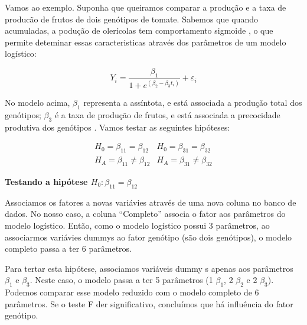 \documentclass[
]{book}
\begin{document}
Vamos ao exemplo. Suponha que queiramos comparar a produção e a taxa de producão de frutos de dois genótipos de tomate. Sabemos que quando acumuladas, a podução de olerícolas tem comportamento sigmoide \citep{Lucio2015, Lucio2016}, o que permite deteminar essas caracteristicas através dos parâmetros de um modelo logístico:

\[
{Y_i} = \frac{{{\beta _1}}}{{1 + {e^{\left( {{\beta _2} - {\beta _3}{t_i}} \right)}}}} + {\varepsilon _i}
\]

No modelo acima, \(\beta_1\) representa a assíntota, e está associada a produção total dos genótipos; \(\beta_3\) é a taxa de produção de frutos, e está associada a precocidade produtiva dos genótipos \citep{Sari2018}. Vamos testar as seguintes hipóteses:

\[
	\begin{array}{*{20}{c}}{{H_0} = {\beta _{11}} = {\beta _{12}}}&{{H_0} = {\beta _{31}} = {\beta _{32}}}\\{{H_A} = {\beta _{11}} \ne {\beta _{12}}}&{{H_A} = {\beta _{31}} \ne {\beta _{32}}}\end{array}
\]

\textbf{Testando a hipótese \(H_0:\beta_{11} = \beta_{12}\)}

Associamos os fatores a novas variávies através de uma nova coluna no banco de dados. No nosso caso, a coluna ``Completo'' associa o fator aos parâmetros do modelo logístico. Então, como o modelo logístico possui 3 parâmetros, ao associarmos variávies dummys ao fator genótipo (são dois genótipos), o modelo completo passa a ter 6 parâmetros.

Para tertar esta hipótese, associamos variáveis dummy s apenas aos parâmetros \(\beta_1\) e \(\beta_3\). Neste caso, o modelo passa a ter 5 parâmetros (1 \(\beta_1\), 2 \(\beta_2\) e 2 \(\beta_3\)). Podemos comparar esse modelo reduzido com o modelo completo de 6 parâmetros. Se o teste F der significativo, concluímos que há influência do fator genótipo.
\end{document}
